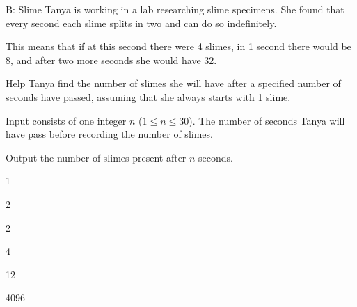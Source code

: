 \begin{problem}{B: Slime}
Tanya is working in a lab researching slime specimens. She found that every second each slime splits in two and can do so indefinitely.

This means that if at this second there were 4 slimes, in 1 second there would be 8, and after two more seconds she would have 32.

Help Tanya find the number of slimes she will have after a specified number of seconds have passed, assuming that she always starts with 1 slime. 
\end{problem}

\begin{formalin}
Input consists of one integer $n$ ($1 \leq n \leq 30$). The number of seconds Tanya will have pass before recording the number of slimes.
\end{formalin}

\begin{formalout}
Output the number of slimes present after $n$ seconds.
\end{formalout}

\begin{datain}
1
\end{datain}
\begin{dataout}
2
\end{dataout}

\begin{datain}
2
\end{datain}
\begin{dataout}
4
\end{dataout}

\begin{datain}
12
\end{datain}
\begin{dataout}
4096
\end{dataout}


